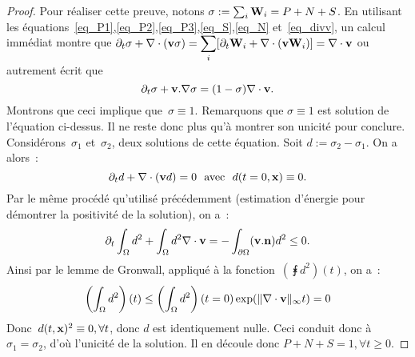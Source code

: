 \documentclass[main.tex]{subfiles}
\begin{document}
\begin{proof}
Pour réaliser cette preuve, notons $\sigma := \sum_i {\bf W}_i = P+N+S$. %
En utilisant les équations~\eqref{eq_P1},\eqref{eq_P2},\eqref{eq_P3},\eqref{eq_S},\eqref{eq_N} et~\eqref{eq_divv}, un calcul immédiat montre que 
$\displaystyle\partial_t \sigma + \nabla\cdot (\mathbf{v} \sigma ) = \sum_i  [ \partial_t {\bf W}_i + \nabla\cdot(\mathbf{v}{\bf W}_i) ]  = \nabla\cdot \mathbf{v}$ ou autrement écrit que $$ \partial_t \sigma + \mathbf{v} . \nabla \sigma  = (1-\sigma) \nabla\cdot \mathbf{v}.$$ Montrons que ceci implique que~$\sigma\equiv1$. Remarquons que $\sigma\equiv1$ est solution de l'équation ci-dessus. Il ne reste donc plus qu'à montrer son unicité pour conclure. Considérons~$\sigma_1$ et~$\sigma_2$, deux solutions de cette équation. Soit $d:=\sigma_2-\sigma_1$. On a alors~:
$$ \partial_t d + \nabla\cdot (\mathbf{v} d) = 0 \textrm{~~avec~~} d(t=0,\mathbf{x})\equiv0. $$
Par le même procédé qu'utilisé précédemment (estimation d'énergie pour démontrer la positivité de la solution), on a~:
\begin{equation}
\partial_t \int_\Omega d^2 + \int_\Omega d^2 \nabla\cdot \mathbf{v} = - \int_{\partial \Omega} (\mathbf{v} . {\bf n}) d^2 \leq 0.
\end{equation}
Ainsi par le lemme de Gronwall, appliqué à la fonction~$\left(\intx d^2 \right)(t)$, on a~:
\begin{equation}
\left(\int_\Omega d^2 \right)(t) \leq \left(\int_\Omega d^2 \right)(t=0) \exp ( \| \nabla\cdot \mathbf{v} \|_{\infty} t ) = 0
\end{equation}
Donc~$d(t,\mathbf{x})^2\equiv0, \forall t$, donc $d$ est identiquement nulle. Ceci conduit donc à~$\sigma_1=\sigma_2$, d'où l'unicité de la solution. 
Il en découle donc $P+N+S=1, \forall t\geq 0$.
\end{proof}

\end{document}
